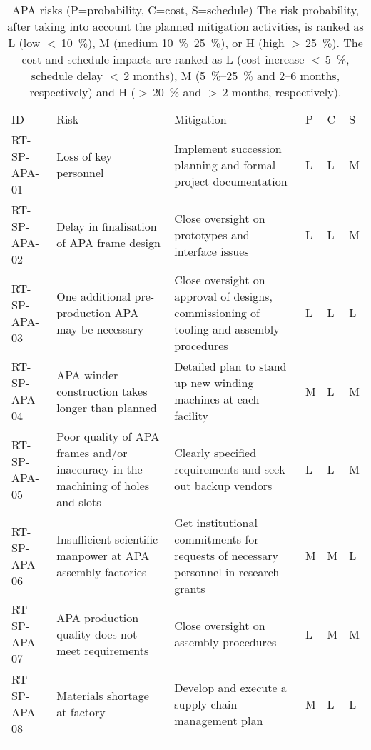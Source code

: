 
\begin{footnotesize}
\begin{longtable}{P{0.18\textwidth}P{0.20\textwidth}P{0.32\textwidth}P{0.02\textwidth}P{0.02\textwidth}P{0.02\textwidth}} 
\caption[APA risks]{APA risks (P=probability, C=cost, S=schedule) The risk probability, after taking into account the planned mitigation activities, is ranked as 
L (low $<\,$\SI{10}{\%}), 
M (medium \SIrange{10}{25}{\%}), or 
H (high $>\,$\SI{25}{\%}). 
The cost and schedule impacts are ranked as 
L (cost increase $<\,$\SI{5}{\%}, schedule delay $<\,$\num{2} months), 
M (\SIrange{5}{25}{\%} and 2--6 months, respectively) and 
H ($>\,$\SI{20}{\%} and $>\,$2 months, respectively). } \\
ID & Risk & Mitigation & P & C & S  \\  \colhline
RT-SP-APA-01 & Loss of key personnel & Implement succession planning and formal project documentation & L & L & M \\  \colhline
RT-SP-APA-02 & Delay in finalisation of APA frame design & Close oversight on prototypes and interface issues & L & L & M \\  \colhline
RT-SP-APA-03 & One additional pre-production APA may be necessary & Close oversight on approval of designs, commissioning of tooling and assembly procedures & L & L & L \\  \colhline
RT-SP-APA-04 & APA winder construction takes longer than planned & Detailed plan to stand up new winding machines at each facility & M & L & M \\  \colhline
RT-SP-APA-05 & Poor quality of APA frames and/or inaccuracy in the machining of holes and slots & Clearly specified requirements and seek out backup vendors & L & L & M \\  \colhline
RT-SP-APA-06 & Insufficient scientific manpower at APA assembly factories & Get institutional commitments for requests of necessary personnel in research grants & M & M & L \\  \colhline
RT-SP-APA-07 & APA production quality does not meet requirements & Close oversight on assembly procedures & L & M & M \\  \colhline
RT-SP-APA-08 & Materials shortage at factory & Develop and execute a supply chain management plan & M & L & L \\  \colhline

\end{longtable}
\end{footnotesize}
